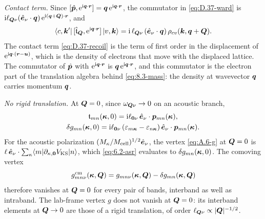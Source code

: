 \emph{Contact term.} Since $[\hat{\bm{p}},\mathrm{e}^{\mathrm{i}\bm{q}\cdot\bm{r}}] = \bm{q}\,\mathrm{e}^{\mathrm{i}\bm{q}\cdot\bm{r}}$, the commutator in \cref{eq:D.37-ward} is $\mathrm{i}\ell_{\bm{Q}\nu}(\hat{\bm{e}}_\nu\cdot\bm{q})\,\mathrm{e}^{\mathrm{i}(\bm{q}+\bm{Q})\cdot\bm{r}}$, and
\begin{equation}
  \langle c,\bm{k}'|\,[\hat{\mathfrak{t}}_{\bm{Q}},\mathrm{e}^{\mathrm{i}\bm{q}\cdot\bm{r}}]\,|v,\bm{k}\rangle = \mathrm{i}\,\ell_{\bm{Q}\nu}\,(\hat{\bm{e}}_\nu\cdot\bm{q})\,\rho_{cv}(\bm{k},\bm{q}+\bm{Q}) .
  \label{eq:D.37-recoil}
\end{equation}
The contact term \cref{eq:D.37-recoil} is the term of first order in the displacement of $\mathrm{e}^{\mathrm{i}\bm{q}\cdot(\bm{r} - \bm{u})}$, which is the density of electrons that move with the displaced lattice. The commutator of $\hat{\bm{p}}$ with $\mathrm{e}^{\mathrm{i}\bm{q}\cdot\bm{r}}$ is $\bm{q}\,\mathrm{e}^{\mathrm{i}\bm{q}\cdot\bm{r}}$, and this commutator is the electron part of the translation algebra behind \cref{eq:8.3-mass}: the density at wavevector $\bm{q}$ carries momentum $\bm{q}$.

\emph{No rigid translation.} At $\bm{Q} = 0$, since $\omega_{\bm{Q}\nu} \to 0$ on an acoustic branch,
\begin{equation*}
  \begin{gathered}
  \mathfrak{t}_{mn}(\bm{\kappa},0) = \mathrm{i}\ell_{\bm{0}\nu}\,\hat{\bm{e}}_\nu\cdot\bm{p}_{mn}(\bm{\kappa}) , \\
  \delta g_{mn}(\bm{\kappa},0) = \mathrm{i}\ell_{\bm{0}\nu}\,(\varepsilon_{m\bm{\kappa}} - \varepsilon_{n\bm{\kappa}})\,\hat{\bm{e}}_\nu\cdot\bm{p}_{mn}(\bm{\kappa}) .
  \end{gathered}
\end{equation*}
For the acoustic polarization $(M_\kappa/M_{\mathrm{cell}})^{1/2}\hat{\bm{e}}_\nu$, the vertex \cref{eq:A.6-g} at $\bm{Q} = 0$ is $\ell\,\hat{\bm{e}}_\nu\cdot\sum_\kappa\langle m|\partial_{\kappa,\bm{0}}V_{\mathrm{KS}}|n\rangle$, which \cref{eq:6.2-asr} evaluates to $\delta g_{mn}(\bm{\kappa},0)$. The comoving vertex
\begin{equation}
  g^{\mathrm{cm}}_{mn\nu}(\bm{\kappa},\bm{Q}) = g_{mn\nu}(\bm{\kappa},\bm{Q}) - \delta g_{mn}(\bm{\kappa},\bm{Q})
  \label{eq:D.37-gcm}
\end{equation}
therefore vanishes at $\bm{Q} = 0$ for every pair of bands, interband as well as intraband. The lab-frame vertex $g$ does not vanish at $\bm{Q} = 0$: its interband elements at $\bm{Q} \to 0$ are those of a rigid translation, of order $\ell_{\bm{Q}\nu} \propto |\bm{Q}|^{-1/2}$.

